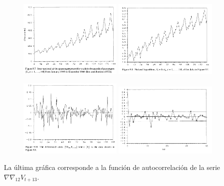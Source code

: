 \begin{figure}[H]
    \centering
    \includegraphics[width=0.45\textwidth]{../pictures/image1.png}
    \hfill
    \includegraphics[width=0.45\textwidth]{../pictures/image2.png}
\end{figure}


\begin{figure}[H]
    \centering
    \includegraphics[width=0.45\textwidth]{../pictures/image3.png}
    \hfill
    \includegraphics[width=0.45\textwidth]{../pictures/image4.png}
\end{figure}

La última gráfica corresponde a la función de autocorrelación de la serie $\nabla \nabla_{12} V_{t+13}$. 

